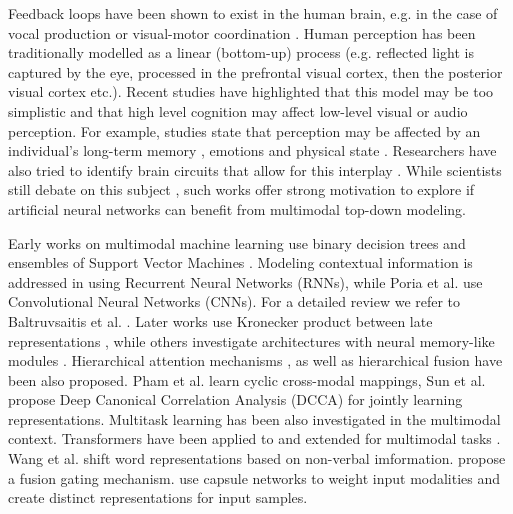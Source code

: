 \documentclass{article}
\begin{document}
Feedback loops have been shown to exist in the human brain, e.g. in the case of vocal production \cite{houde2015cortical} or visual-motor coordination \cite{SHAFER2019112214}.
Human perception has been traditionally modelled as a linear (bottom-up) process (e.g. reflected light is captured by the eye, processed in the prefrontal visual cortex, then the posterior visual cortex etc.).
Recent studies have highlighted that this model may be too simplistic and that high level cognition may affect low-level visual \cite{bar2013top,TEUFEL201717} or audio \cite{sohoglu2012predictive} perception. 
For example, studies state that perception may be affected by an individual's long-term memory \cite{lupyan2017objective}, emotions \cite{balcetis2010wishful} and physical state \cite{proffitt1995perceiving}.
Researchers have also tried to identify brain circuits that allow for this interplay \cite{MANITA20151304}.
While scientists still debate on this subject \cite{firestone2014top}, such works offer strong motivation to explore if artificial neural networks can benefit from multimodal top-down modeling.



Early works on multimodal machine learning use binary decision trees \cite{lee2011emotion} and ensembles of Support Vector Machines \cite{rozgic2012ensemble}. Modeling contextual information is addressed in \cite{metallinou2012context, wollmer2013lstm, shenoy-sardana-2020-multilogue} using Recurrent Neural Networks (RNNs), while Poria et al. \cite{poria-cmkl-16} use Convolutional Neural Networks (CNNs). For a detailed review we refer to Baltruvsaitis et al. \cite{baltruvsaitis2018multimodal}. Later works use Kronecker product between late representations \cite{zadeh2017tensor, liu2018efficient}, while others investigate architectures with neural memory-like modules \cite{Zadeh_Liang_Poria_Vij_Cambria_Morency_2018, bagher-zadeh-etal-2018-multimodal}. Hierarchical attention mechanisms \cite{gu2018multimodal}, as well as hierarchical fusion \cite{georgiou2019deep} have been also proposed.
Pham et al. \cite{pham2019found} learn cyclic cross-modal mappings, Sun et al. \cite{sun2019multi} propose Deep Canonical Correlation Analysis (DCCA) for jointly learning representations. Multitask learning has been also investigated \cite{Khare_2020} in the multimodal context. Transformers \cite{vaswani2017attention} have been applied to and extended for multimodal tasks 
\cite{tsai-etal-2019-multimodal, vilbert2019, delbrouck-etal-2020-transformer, rahman-etal-2020-integrating}.
Wang et al. \cite{wang2019words} shift word representations based on non-verbal imformation. 
\cite{kumar2020gated} propose a fusion gating mechanism. \cite{tsai-etal-2020-multimodal} use capsule networks \cite{capsules2017} to weight input modalities and create distinct representations for input samples.
\end{document}
